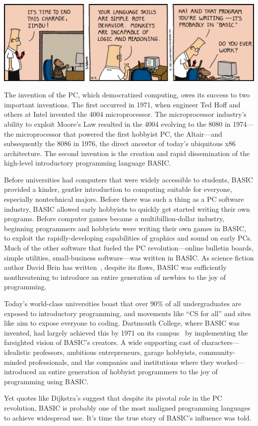 

\includegraphics[width=\textwidth]{figs/dilbert-1991-12-04.png}

The invention of the PC, which democratized computing, owes its success
to two important inventions.  
The first occurred in 1971, when engineer Ted Hoff and others
at Intel invented the 4004 microprocessor.
The microprocessor industry's ability to exploit Moore's Law resulted in
the 4004 evolving to the 8080 in 1974---the microprocessor that powered
the first hobbyist PC, the Altair---and subsequently the 8086 in 1976,
the direct  ancestor of today's ubiquitous x86
architecture.
The second invention is the creation and rapid dissemination of the
high-level introductory programming language BASIC.

Before universities had computers that were widely accessible to students, BASIC
provided a kinder, gentler introduction to computing suitable for
everyone, especially nontechnical majors.
Before there was such a thing as a PC software industry, 
BASIC allowed early hobbyists to quickly get started writing their own
programs.
Before computer games became a multibillion-dollar industry, beginning
programmers and hobbyists were writing their own games in BASIC, to
exploit the rapidly-developing capabilities of graphics and sound on
early PCs. 
Much of the other software that fueled the PC revolution---online
bulletin boards, simple utilities, small-business software---was written
in BASIC. 
As science fiction author David Brin has written~\cite{why_johnny_cant_code},
despite its flaws, BASIC
was sufficiently nonthreatening to introduce an entire generation of
newbies to the joy of programming.

Today's world-class universities boast that over 90\% of all
undergraduates are exposed to introductory programming, and movements
like ``CS for all'' and sites like  aim to expose everyone
to coding.
Dartmouth College, where BASIC was invented, had largely
achieved this by 1971 on its campus~\cite{man_and_computer} by implementing the
farsighted vision of BASIC's creators.
A wide supporting cast of characters---idealistic professors,
ambitious entrepreneurs, garage hobbyists, community-minded
professionals, and the companies and institutions where they
worked---introduced  an entire generation
of hobbyist programmers to the joy of programming using BASIC.

Yet quotes like Dijkstra's suggest that despite its pivotal role in the PC
revolution, BASIC is probably one of the most maligned programming
languages to achieve widespread use.  It's time the true story of
BASIC's influence was told.
